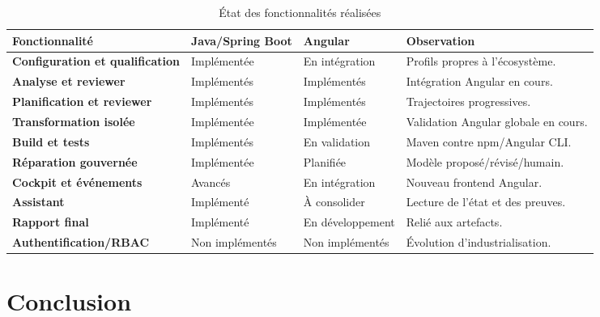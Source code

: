 \begin{table}[H]
    \centering
    \scriptsize
    \begin{tabularx}{\textwidth}{|>{\bfseries\RaggedRight\arraybackslash}p{4.2cm}|>{\centering\arraybackslash}p{3.0cm}|>{\centering\arraybackslash}p{3.0cm}|>{\RaggedRight\arraybackslash}X|}
        \hline
        \rowcolor{cgilight!95}
        \textbf{Fonctionnalité} & \textbf{Java/Spring Boot} & \textbf{Angular} & \textbf{Observation} \\
        \hline
        Configuration et qualification & Implémentée & En intégration & Profils propres à l'écosystème. \\
        \hline
        Analyse et reviewer & Implémentés & Implémentés & Intégration Angular en cours. \\
        \hline
        Planification et reviewer & Implémentés & Implémentés & Trajectoires progressives. \\
        \hline
        Transformation isolée & Implémentée & Implémentée & Validation Angular globale en cours. \\
        \hline
        Build et tests & Implémentés & En validation & Maven contre npm/Angular CLI. \\
        \hline
        Réparation gouvernée & Implémentée & Planifiée & Modèle proposé/révisé/humain. \\
        \hline
        Cockpit et événements & Avancés & En intégration & Nouveau frontend Angular. \\
        \hline
        Assistant & Implémenté & À consolider & Lecture de l'état et des preuves. \\
        \hline
        Rapport final & Implémenté & En développement & Relié aux artefacts. \\
        \hline
        Authentification/RBAC & Non implémentés & Non implémentés & Évolution d'industrialisation. \\
        \hline
    \end{tabularx}
    \caption{État des fonctionnalités réalisées}
    \label{tab:fonctionnalites-realisees-ch4}
\end{table}

\section*{Conclusion}

